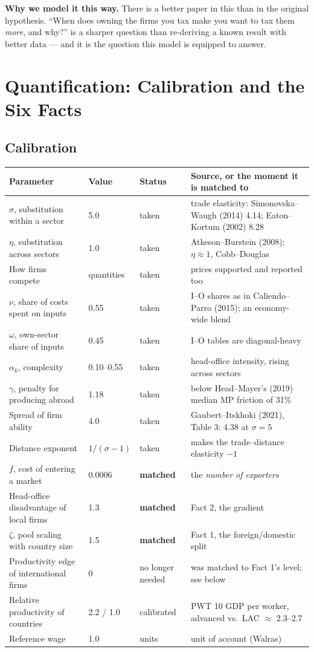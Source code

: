 \documentclass[11pt]{article}
\newcommand{\why}[1]{\smallskip\noindent\textbf{Why we model it this way.} #1\smallskip}
\theoremstyle{plain}
\theoremstyle{remark}
\theoremstyle{definition}
\begin{document}
\why{There is a better paper in this than in the original hypothesis. ``When does
owning the firms you tax make you want to tax them \emph{more}, and why?'' is a sharper
question than re-deriving a known result with better data --- and it is the question
this model is equipped to answer.}

\newpage
\section{Quantification: Calibration and the Six Facts}
\label{sec:quant}

\subsection{Calibration}
\label{sec:calibration}

\begin{center}
\small
\begin{tabular}{llll}
\toprule
Parameter & Value & Status & Source, or the moment it is matched to\\
\midrule
$\sigma$, substitution within a sector & 5.0 & taken & trade elasticity: Simonovska--Waugh (2014) 4.14; Eaton--Kortum (2002) 8.28\\
$\eta$, substitution across sectors & 1.0 & taken & Atkeson--Burstein (2008): $\eta\approx1$, Cobb--Douglas\\
How firms compete & quantities & taken & prices supported and reported too\\
$\nu$, share of costs spent on inputs & 0.55 & taken & I--O shares as in Caliendo--Parro (2015); an economy-wide blend\\
$\omega$, own-sector share of inputs & 0.45 & taken & I--O tables are diagonal-heavy\\
$\alpha_k$, complexity & 0.10--0.55 & taken & head-office intensity, rising across sectors\\
$\gamma$, penalty for producing abroad & 1.18 & taken & below Head--Mayer's (2019) median MP friction of 31\%\\
Spread of firm ability & 4.0 & taken & Gaubert--Itskhoki (2021), Table 3: 4.38 at $\sigma=5$\\
Distance exponent & $1/(\sigma-1)$ & taken & makes the trade--distance elasticity $-1$\\
\midrule
$f$, cost of entering a market & 0.0006 & \textbf{matched} & the \emph{number of exporters}\\
Head-office disadvantage of local firms & 1.3 & \textbf{matched} & Fact 2, the gradient\\
$\zeta$, pool scaling with country size & 1.5 & \textbf{matched} & Fact 1, the foreign/domestic split\\
\midrule
Productivity edge of international firms & 0 & no longer needed & was matched to Fact 1's level; see below\\
Relative productivity of countries & 2.2 / 1.0 & calibrated & PWT 10 GDP per worker, advanced vs.\ LAC $\approx$ 2.3--2.7\\
Reference wage & 1.0 & units & unit of account (Walras)\\
\bottomrule
\end{tabular}
\end{center}
\end{document}
